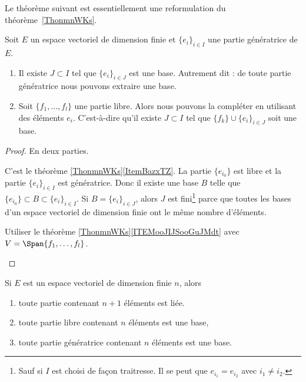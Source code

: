 Le théorème suivant est essentiellement une reformulation du théorème~\ref{ThonmnWKs}.
\begin{theorem} \label{ThoMGQZooIgrXjy}
	Soit \( E\) un espace vectoriel de dimension finie et \( \{ e_i \}_{i\in I}\) une partie génératrice de \( E\).

	\begin{enumerate}
		\item       \label{ITEMooTZUDooFEgymQ}
		      Il existe \( J\subset I\) tel que \( \{ e_i \}_{i\in J}\) est une base. Autrement dit : de toute partie génératrice nous pouvons extraire une base.
		\item       \label{ITEMooCJQGooXwjsfm}
		      Soit \( \{ f_1,\ldots, f_l \}\) une partie libre. Alors nous pouvons la compléter en utilisant des éléments \( e_i\). C'est-à-dire qu'il existe \( J\subset I\) tel que \( \{ f_k \}\cup\{ e_i \}_{i\in J}\) soit une base.
	\end{enumerate}
\end{theorem}

\begin{proof}
	En deux parties.
	\begin{subproof}
		C'est le théorème \ref{ThonmnWKs}\ref{ItemBazxTZ}. La partie \( \{ e_{i_0} \}\) est libre et la partie \( \{ e_i \}_{i\in I}\) est génératrice. Donc il existe une base \( B\) telle que \( \{ e_{i_0} \}\subset B\subset\{ e_i \}_{i\in I}\). Si \( B=\{ e_i \}_{i\in J}\), alors \( J\) est fini\footnote{Sauf si \( I\) est choisi de façon traitresse. Il se peut que \( e_{i_1}=e_{i_2}\) avec \( i_1\neq i_2\).} parce que toutes les bases d'un espace vectoriel de dimension finie ont le même nombre d'éléments.

		Utiliser le théorème \ref{ThonmnWKs}\ref{ITEMooJIJSooGuJMdt} avec \( V=\Span\{ f_1,\ldots,f_l \}\).
	\end{subproof}
\end{proof}

\begin{proposition}     \label{PROPooVEVCooHkrldw}
	Si \( E\) est un espace vectoriel de dimension finie \( n\), alors
	\begin{enumerate}
		\item       \label{ITEMooZNLDooBISkJyBS}
		      toute partie contenant \( n+1\) éléments est liée.
		\item       \label{ITEMooSGGCooOUsuBs}
		      toute partie libre contenant \( n\) éléments est une base,
		\item
		      toute partie génératrice contenant \( n\) éléments est une base.
	\end{enumerate}
\end{proposition}

